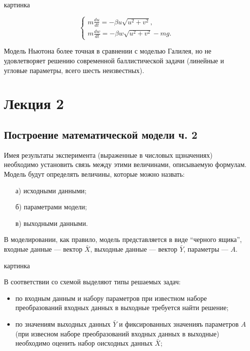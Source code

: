 \documentclass[12pt]{article}
\begin{document}
\begin{center}
    картинка
\end{center}

\[
\begin{cases}
    m \frac{du}{dt} = - \beta u \sqrt{u^2 + v^2},\\
    m \frac{dw}{dt} = - \beta w \sqrt{u^2 + v^2} - mg.
\end{cases}
\]

Модель Ньютона более точная в сравнении с моделью Галилея, но не удовлетворяет решению современной баллистической задачи (линейные и угловые параметры, всего шесть неизвестных).

\newpage
\section{Лекция 2}
\subsection{Построение математической модели ч. 2}
Имея результаты эксперимента (выраженные в числовых щзначениях) необходимо установить связь между этими величинами, описываемую формулам. Модель будут определять величины, которые можно назвать:
\begin{enumerate}
    \item[а)] исходными данными;
    \item[б)] параметрами модели;
    \item[в)] выходными данными.
\end{enumerate}

В моделировании, как правило, модель представляется в виде \enquote{черного ящика}, входные данные --- вектор $\bar{X}$, выходные данные --- вектор $\bar{Y}$, параметры --- $A$.

\begin{center}
    картинка
\end{center}

В соответствии со схемой выделяют типы решаемых задач:

\begin{itemize}
    \item по входным данным и набору параметров при известном наборе преобразований входных данных в выходные требуется найти решение;
    \item по значениям выходных данных $\bar{Y}$ и фиксированных значенияъ параметров $A$ (при извесном наборе преобразований входных данных в выходные) необходимо оценить набор оисходных данных $\bar{X}$;
\end{itemize}
\end{document}
